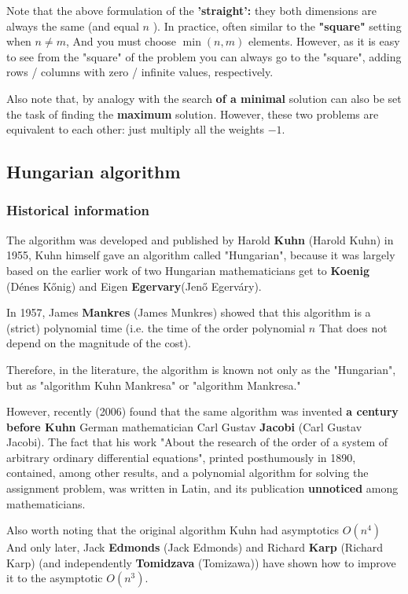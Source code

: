 Note that the above formulation of the \textbf{'straight':} they both dimensions are always the same (and equal $n$ ). In practice, often similar to the \textbf{"square"} setting when $n \ne m$, And you must choose $\min (n, m)$ elements. However, as it is easy to see from the "square" of the problem you can always go to the "square", adding rows / columns with zero / infinite values, respectively.

Also note that, by analogy with the search \textbf{of a minimal} solution can also be set the task of finding the \textbf{maximum} solution. However, these two problems are equivalent to each other: just multiply all the weights $-1$.

\subsection{ Hungarian algorithm }

\subsubsection{ Historical information }

The algorithm was developed and published by Harold \textbf{Kuhn} (Harold Kuhn) in 1955, Kuhn himself gave an algorithm called "Hungarian", because it was largely based on the earlier work of two Hungarian mathematicians get to \textbf{Koenig} (Dénes Kőnig) and Eigen \textbf{Egervary}(Jenő Egerváry).

In 1957, James \textbf{Mankres} (James Munkres) showed that this algorithm is a (strict) polynomial time (i.e. the time of the order polynomial $n$ That does not depend on the magnitude of the cost).

Therefore, in the literature, the algorithm is known not only as the "Hungarian", but as "algorithm Kuhn Mankresa" or "algorithm Mankresa."

However, recently (2006) found that the same algorithm was invented \textbf{a century before Kuhn} German mathematician Carl Gustav \textbf{Jacobi} (Carl Gustav Jacobi). The fact that his work "About the research of the order of a system of arbitrary ordinary differential equations", printed posthumously in 1890, contained, among other results, and a polynomial algorithm for solving the assignment problem, was written in Latin, and its publication \textbf{unnoticed} among mathematicians.

Also worth noting that the original algorithm Kuhn had asymptotics $O (n ^ 4)$ And only later, Jack \textbf{Edmonds} (Jack Edmonds) and Richard \textbf{Karp} (Richard Karp) (and independently \textbf{Tomidzava} (Tomizawa)) have shown how to improve it to the asymptotic $O (n ^ 3)$.

